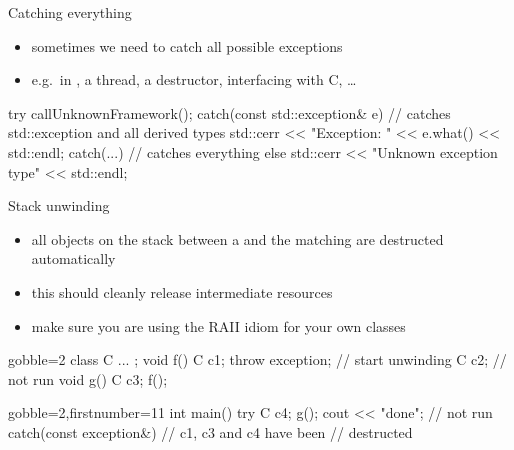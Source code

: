 \begin{frame}[fragile]
  \begin{block}{Catching everything}
    \begin{itemize}
    \item sometimes we need to catch all possible exceptions
    \item e.g.\ in , a thread, a destructor, interfacing with C, \ldots
    \end{itemize}
  \end{block}
  \begin{cppcode}

    try {
      callUnknownFramework();
    } catch(const std::exception& e) {
      // catches std::exception and all derived types
      std::cerr << "Exception: " << e.what() << std::endl;
    } catch(...) {
      // catches everything else
      std::cerr << "Unknown exception type" << std::endl;
    }
  \end{cppcode}
\end{frame}

\begin{frame}[fragile]
  \begin{block}{Stack unwinding}
    \begin{itemize}
      \item all objects on the stack between a  and the matching  are destructed automatically
      \item this should cleanly release intermediate resources
      \item make sure you are using the RAII idiom for your own classes
    \end{itemize}
  \end{block}
  \begin{multicols}{2}
    \begin{cppcode*}{gobble=2}
      class C { ... };
      void f() {
        C c1;
        throw exception{};
          // start unwinding
        C c2; // not run
      }
      void g() {
        C c3; f();
      }
    \end{cppcode*}
    \columnbreak
    \begin{cppcode*}{gobble=2,firstnumber=11}
      int main() {
        try {
          C c4;
          g();
          cout << "done"; // not run
        } catch(const exception&) {
          // c1, c3 and c4 have been
          // destructed
        }
      }
    \end{cppcode*}
  \end{multicols}
\end{frame}

